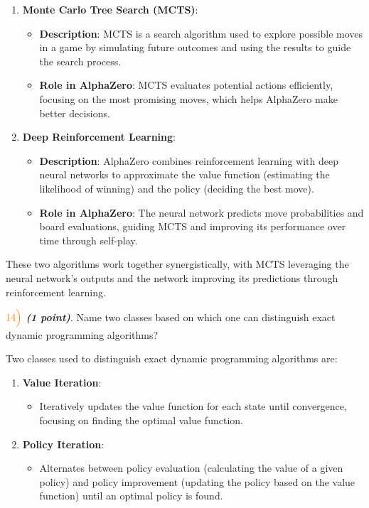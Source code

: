 \documentclass[11pt]{article}
\providecommand{\tightlist}{%
      \setlength{\itemsep}{0pt}\setlength{\parskip}{0pt}}
\begin{document}
\begin{enumerate}
\def\labelenumi{\arabic{enumi}.}
\tightlist
\item
  \textbf{Monte Carlo Tree Search (MCTS)}:

  \begin{itemize}
  \tightlist
  \item
    \textbf{Description}: MCTS is a search algorithm used to explore
    possible moves in a game by simulating future outcomes and using the
    results to guide the search process.
  \item
    \textbf{Role in AlphaZero}: MCTS evaluates potential actions
    efficiently, focusing on the most promising moves, which helps
    AlphaZero make better decisions.
  \end{itemize}
\item
  \textbf{Deep Reinforcement Learning}:

  \begin{itemize}
  \tightlist
  \item
    \textbf{Description}: AlphaZero combines reinforcement learning with
    deep neural networks to approximate the value function (estimating
    the likelihood of winning) and the policy (deciding the best move).
  \item
    \textbf{Role in AlphaZero}: The neural network predicts move
    probabilities and board evaluations, guiding MCTS and improving its
    performance over time through self-play.
  \end{itemize}
\end{enumerate}

These two algorithms work together synergistically, with MCTS leveraging
the neural network's outputs and the network improving its predictions
through reinforcement learning.

    \(\color{orange}14\Bigl)\) \textbf{\emph{(1 point)}}. Name two classes
based on which one can distinguish exact dynamic programming algorithms?

    Two classes used to distinguish exact dynamic programming algorithms
are:

\begin{enumerate}
\def\labelenumi{\arabic{enumi}.}
\tightlist
\item
  \textbf{Value Iteration}:

  \begin{itemize}
  \tightlist
  \item
    Iteratively updates the value function for each state until
    convergence, focusing on finding the optimal value function.
  \end{itemize}
\item
  \textbf{Policy Iteration}:

  \begin{itemize}
  \tightlist
  \item
    Alternates between policy evaluation (calculating the value of a
    given policy) and policy improvement (updating the policy based on
    the value function) until an optimal policy is found.
  \end{itemize}
\end{enumerate}
\end{document}
